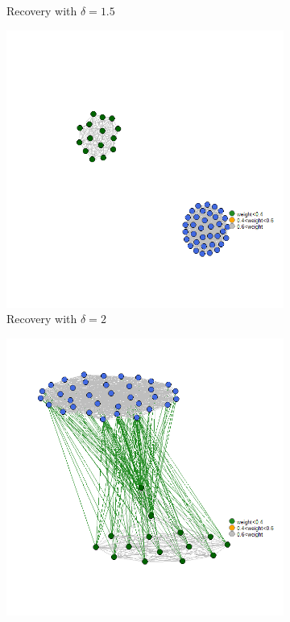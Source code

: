 \documentclass[12pt]{amsart}
\theoremstyle{remark}
\begin{document}
\begin{figure}[h]
\begin{subfigure}[b]{0.37\textwidth}
         \caption{Recovery with $\delta=1.5$}
     \end{subfigure}
     \hfill
     \begin{subfigure}[b]{0.37\textwidth}
         \centering
         \includegraphics[width=\textwidth]{./Pictures/recupera6.png}
         \caption{Recovery with $\delta=2$}
     \end{subfigure}
     \hfill
     \begin{subfigure}[b]{0.37\textwidth}
         \centering
         \includegraphics[width=\textwidth]{./Pictures/recupera7.png}

\end{subfigure}
\end{figure}
\end{document}
